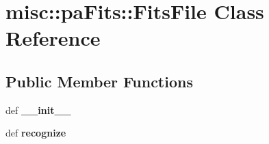 \section{misc::pa\-Fits::Fits\-File Class Reference}
\label{classmisc_1_1paFits_1_1FitsFile}
\subsection*{Public Member Functions}
\begin{CompactItemize}
\item 
def \textbf{\_\-\_\-init\_\-\_\-}\label{classmisc_1_1paFits_1_1FitsFile_2cc0031d093ccec4e6234d7ef6dcf0b5}

\item 
def \textbf{recognize}\label{classmisc_1_1paFits_1_1FitsFile_8f1b47b17ec51fe5aed79b9efb88334a}

\end{CompactItemize}
